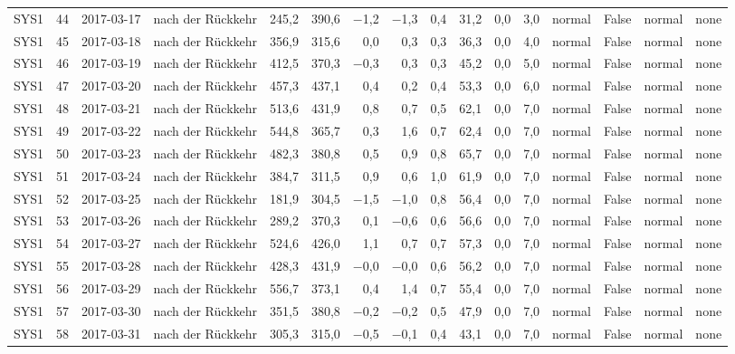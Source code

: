 \begin{tabular}{lrllrrrrrrrrlrll}
SYS1 & 44 & 2017-03-17 & nach der Rückkehr & 245,2 & 390,6 & $-$1,2 & $-$1,3 & 0,4 & 31,2 & 0,0 & 3,0 & normal & False & normal & none \\
SYS1 & 45 & 2017-03-18 & nach der Rückkehr & 356,9 & 315,6 & 0,0 & 0,3 & 0,3 & 36,3 & 0,0 & 4,0 & normal & False & normal & none \\
SYS1 & 46 & 2017-03-19 & nach der Rückkehr & 412,5 & 370,3 & $-$0,3 & 0,3 & 0,3 & 45,2 & 0,0 & 5,0 & normal & False & normal & none \\
SYS1 & 47 & 2017-03-20 & nach der Rückkehr & 457,3 & 437,1 & 0,4 & 0,2 & 0,4 & 53,3 & 0,0 & 6,0 & normal & False & normal & none \\
SYS1 & 48 & 2017-03-21 & nach der Rückkehr & 513,6 & 431,9 & 0,8 & 0,7 & 0,5 & 62,1 & 0,0 & 7,0 & normal & False & normal & none \\
SYS1 & 49 & 2017-03-22 & nach der Rückkehr & 544,8 & 365,7 & 0,3 & 1,6 & 0,7 & 62,4 & 0,0 & 7,0 & normal & False & normal & none \\
SYS1 & 50 & 2017-03-23 & nach der Rückkehr & 482,3 & 380,8 & 0,5 & 0,9 & 0,8 & 65,7 & 0,0 & 7,0 & normal & False & normal & none \\
SYS1 & 51 & 2017-03-24 & nach der Rückkehr & 384,7 & 311,5 & 0,9 & 0,6 & 1,0 & 61,9 & 0,0 & 7,0 & normal & False & normal & none \\
SYS1 & 52 & 2017-03-25 & nach der Rückkehr & 181,9 & 304,5 & $-$1,5 & $-$1,0 & 0,8 & 56,4 & 0,0 & 7,0 & normal & False & normal & none \\
SYS1 & 53 & 2017-03-26 & nach der Rückkehr & 289,2 & 370,3 & 0,1 & $-$0,6 & 0,6 & 56,6 & 0,0 & 7,0 & normal & False & normal & none \\
SYS1 & 54 & 2017-03-27 & nach der Rückkehr & 524,6 & 426,0 & 1,1 & 0,7 & 0,7 & 57,3 & 0,0 & 7,0 & normal & False & normal & none \\
SYS1 & 55 & 2017-03-28 & nach der Rückkehr & 428,3 & 431,9 & $-$0,0 & $-$0,0 & 0,6 & 56,2 & 0,0 & 7,0 & normal & False & normal & none \\
SYS1 & 56 & 2017-03-29 & nach der Rückkehr & 556,7 & 373,1 & 0,4 & 1,4 & 0,7 & 55,4 & 0,0 & 7,0 & normal & False & normal & none \\
SYS1 & 57 & 2017-03-30 & nach der Rückkehr & 351,5 & 380,8 & $-$0,2 & $-$0,2 & 0,5 & 47,9 & 0,0 & 7,0 & normal & False & normal & none \\
SYS1 & 58 & 2017-03-31 & nach der Rückkehr & 305,3 & 315,0 & $-$0,5 & $-$0,1 & 0,4 & 43,1 & 0,0 & 7,0 & normal & False & normal & none \\

\end{tabular}
